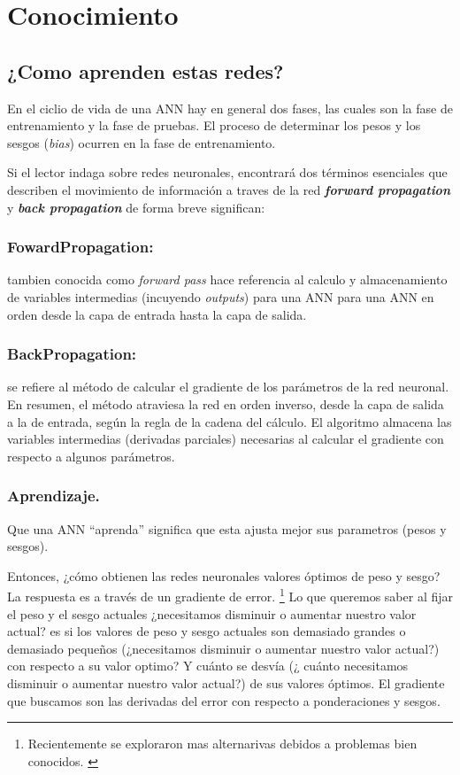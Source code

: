 \documentclass[runningheads]{llncs} %
\begin{document}
\section{Conocimiento}
\subsection{¿Como aprenden estas redes?}
En el ciclio de vida de una ANN hay en general dos fases, las cuales son 
la fase de entrenamiento y la fase de pruebas. El proceso de determinar
los pesos y los sesgos (\textit{bias}) ocurren en la fase de entrenamiento. 
\cite{backpropagation}

Si el lector indaga sobre redes neuronales, encontrará dos términos esenciales 
que describen el movimiento de información a traves de la red 
\textbf{\textit{forward propagation}} y \textbf{\textit{back propagation}} \cite{fun-activacion}
de forma breve significan: 

\subsubsection{FowardPropagation:}
tambien conocida como \textit{forward pass} hace referencia al calculo y
almacenamiento de variables intermedias (incuyendo \textit{outputs}) para
una ANN para una ANN en orden desde la capa de entrada hasta la capa de salida. 
\cite{zhang2023dive}

\subsubsection{BackPropagation:}
se refiere al método de calcular el gradiente de los parámetros de la red neuronal. 
En resumen, el método atraviesa la red en orden inverso, desde la capa de salida a 
la de entrada, según la regla de la cadena del cálculo. 
El algoritmo almacena las variables intermedias (derivadas parciales) 
necesarias al calcular el gradiente con respecto a algunos parámetros.
\cite{zhang2023dive}

\subsubsection{Aprendizaje.}
Que una ANN \textquotedblleft{}aprenda\textquotedblright{} significa que
esta ajusta mejor sus parametros (pesos y sesgos).

Entonces, ¿cómo obtienen las redes neuronales valores óptimos de peso y sesgo? 
La respuesta es a través de un gradiente de error. \footnote[1]{Recientemente
se exploraron mas alternarivas debidos a problemas bien conocidos. \cite{alternativasBP}} 
Lo que queremos saber al fijar 
el peso y el sesgo actuales ¿necesitamos disminuir o aumentar nuestro valor actual?
es si los valores de peso y sesgo actuales son demasiado grandes o demasiado pequeños
(¿necesitamos disminuir o aumentar nuestro valor actual?) con respecto a su valor optimo? 
Y cuánto se desvía (¿ cuánto necesitamos disminuir o aumentar nuestro valor actual?) 
de sus valores óptimos. El gradiente que buscamos son las derivadas del error 
con respecto a ponderaciones y sesgos.\cite{backpropagation}
\end{document}

